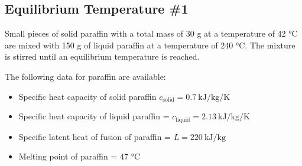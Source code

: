 \documentclass[a4paper,12pt]{article}
\begin{document}
\pagebreak

\subsection{Equilibrium Temperature \#1}

Small pieces of solid paraffin with a total mass of 30 g at a temperature of 42 °C are mixed with 150 g of liquid paraffin at a temperature of 240 °C. The mixture is stirred until an equilibrium temperature is reached.

The following data for paraffin are available:

\begin{itemize}
  \item Specific heat capacity of solid paraffin $c_\text{solid} = \SI{0.7}{\kilo\joule\per\kilogram\per\kelvin}$
  \item Specific heat capacity of liquid paraffin = $c_\text{liquid} = \SI{2.13}{\kilo\joule\per\kilogram\per\kelvin}$
  \item Specific latent heat of fusion of paraffin = $L = \SI{220}{\kilo\joule\per\kilogram}$
  \item Melting point of paraffin = 47 °C
\end{itemize}
\end{document}
